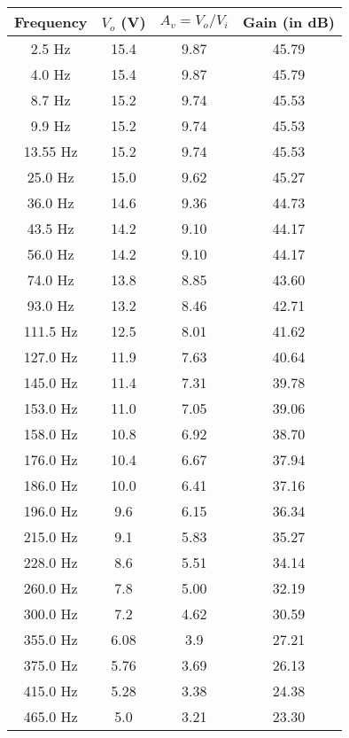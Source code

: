\begin{table}[H]
    \centering
    \begin{tabular}{|c|c|c|c|} \hline
        Frequency & $V_o$ (V) & $A_v = V_o/V_i$ & Gain (in dB) \\ \hline
        2.5 Hz       & 15.4   & 9.87 &  45.79 \\
        4.0 Hz       & 15.4   & 9.87 &  45.79 \\
        8.7 Hz       & 15.2   & 9.74 &  45.53 \\
        9.9 Hz       & 15.2   & 9.74 &  45.53 \\
        13.55 Hz     & 15.2   & 9.74 &  45.53 \\
        25.0 Hz      & 15.0     & 9.62 &  45.27 \\
        36.0 Hz      & 14.6   & 9.36 &  44.73 \\
        43.5 Hz      & 14.2   & 9.10 &  44.17 \\
        56.0 Hz      & 14.2   & 9.10 &  44.17 \\
        74.0 Hz      & 13.8   & 8.85 &  43.60 \\
        93.0 Hz      & 13.2   & 8.46 &  42.71 \\
        111.5 Hz     & 12.5   & 8.01 &  41.62 \\
        127.0 Hz     & 11.9   & 7.63 &  40.64 \\
        145.0 Hz     & 11.4   & 7.31 &  39.78 \\
        153.0 Hz     & 11.0     & 7.05 &  39.06 \\
        158.0 Hz     & 10.8   & 6.92 &  38.70 \\
        176.0 Hz     & 10.4   & 6.67 &  37.94 \\
        186.0 Hz     & 10.0     & 6.41 &  37.16 \\
        196.0 Hz     &  9.6   & 6.15 &  36.34 \\
        215.0 Hz     &  9.1   & 5.83 &  35.27 \\
        228.0 Hz     &  8.6   & 5.51 &  34.14 \\
        260.0 Hz     &  7.8   & 5.00    &  32.19 \\
        300.0 Hz     &  7.2   & 4.62 &  30.59 \\
        355.0 Hz     &  6.08  & 3.9  &  27.21 \\
        375.0 Hz     &  5.76  & 3.69 &  26.13 \\
        415.0 Hz     &  5.28  & 3.38 &  24.38 \\
        465.0 Hz     &  5.0     & 3.21 &  23.30 \\

\end{tabular}
\end{table}
